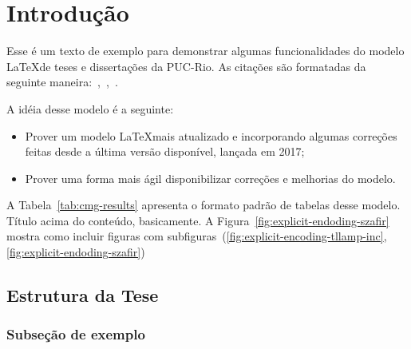 \newpage

\chapter{Introdução}
\label{chap:introduction}

Esse é um texto de exemplo para demonstrar algumas funcionalidades do modelo \LaTeX de teses e dissertações da PUC-Rio. As citações são formatadas da seguinte maneira:~\cite{Lee2010},~\cite{Hummel2013},~\cite{Dupacova2003}. 

A idéia desse modelo é a seguinte:

\begin{itemize}
\item Prover um modelo \LaTeX mais atualizado e incorporando algumas correções feitas desde a última versão disponível, lançada em 2017;
\item Prover uma forma mais ágil disponibilizar correções e melhorias do modelo.
\end{itemize}

A Tabela~\ref{tab:cmg-results} apresenta o formato padrão de tabelas desse modelo. Título acima do conteúdo, basicamente. A Figura~\ref{fig:explicit-endoding-szafir} mostra como incluir figuras com subfiguras~(\ref{fig:explicit-encoding-tllamp-inc}, \ref{fig:explicit-endoding-szafir})

\section{Estrutura da Tese}
\label{sec:organization}

\subsection{Subseção de exemplo}

